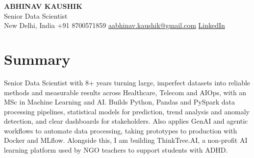 \documentclass[10pt,a4paper]{article}
\begin{document}
\begin{center}
  {\LARGE\bfseries ABHINAV KAUSHIK}\\[2pt]
  {\large Senior Data Scientist}\\[2pt]
  New Delhi, India \textbar{} +91 8700571859 \textbar{} \href{mailto:aabhinav.kaushik@gmail.com}{aabhinav.kaushik@gmail.com} \textbar{} \href{https://www.linkedin.com/in/abhinav-kaushik10/}{LinkedIn}  
\end{center}

\section{Summary}
Senior Data Scientist with 8+ years turning large, imperfect datasets into reliable methods and measurable results across Healthcare, Telecom and AIOps, with an MSc in Machine Learning and AI. Builds Python, Pandas and PySpark data processing pipelines, statistical models for prediction, trend analysis and anomaly detection, and clear dashboards for stakeholders. Also applies GenAI and agentic workflows to automate data processing, taking prototypes to production with Docker and MLflow. Alongside this, I am building ThinkTree.AI, a non-profit AI learning platform used by NGO teachers to support students with ADHD.
\end{document}
